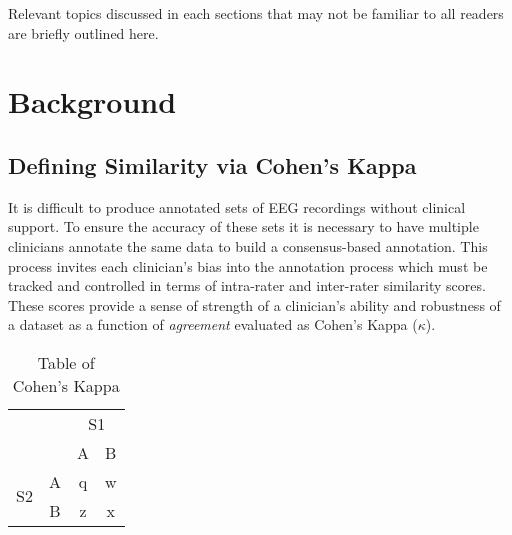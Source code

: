 
Relevant topics discussed in each sections that may not be familiar to all readers are briefly outlined here.

\section{Background}

\subsection{Defining Similarity via Cohen's Kappa}
\label{append-cohen}

It is difficult to produce annotated sets of \ac{EEG} recordings without clinical support. To ensure the accuracy of these sets it is necessary to have multiple clinicians annotate the same data to build a consensus-based annotation. This process invites each clinician's bias into the annotation process which must be tracked and controlled in terms of intra-rater and inter-rater similarity scores. These scores provide a sense of strength of a clinician's ability and robustness of a dataset as a function of \emph{agreement} evaluated as Cohen's Kappa ($\kappa$).

\begin{table}[ht]
\caption{Table of Cohen's Kappa}
\centering
\begin{tabular}{cccc}
\toprule
&                        & \multicolumn{2}{c}{S1}                          \\
\cline{3-4} 
& \multicolumn{1}{c|}{}  & \multicolumn{1}{c|}{A} & \multicolumn{1}{c|}{B} \\
\cline{2-4} 
\multicolumn{1}{c|}{\multirow{2}{*}{S2}} & \multicolumn{1}{c|}{A} & \multicolumn{1}{c|}{q} & \multicolumn{1}{c|}{w} \\
\cline{2-4} 
\multicolumn{1}{c|}{} & \multicolumn{1}{c|}{B} & \multicolumn{1}{c|}{z} & \multicolumn{1}{c|}{x} \\ \cline{2-4} 
\end{tabular}
\label{tab:kappa}
\end{table}

